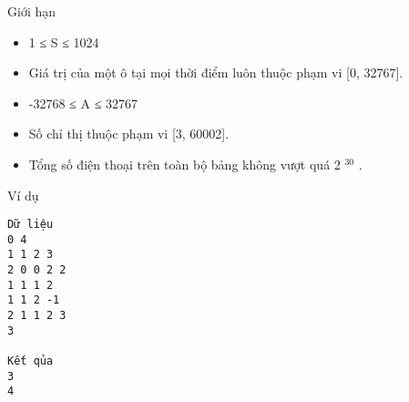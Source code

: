 Giới hạn
\begin{itemize}
	\item 1 ≤ S ≤ 1024
	\item Giá trị của một ô tại mọi thời điểm luôn thuộc phạm vi [0, 32767].
	\item -32768 ≤ A ≤ 32767
	\item Số chỉ thị thuộc phạm vi [3, 60002].
	\item Tổng số điện thoại trên toàn bộ bảng không vượt quá 2 $^ 30 $ .
\end{itemize}
Ví dụ
\begin{verbatim}
Dữ liệu
0 4  		
1 1 2 3  		
2 0 0 2 2
1 1 1 2
1 1 2 -1
2 1 1 2 3
3

Kết qủa
3
4
\end{verbatim}
